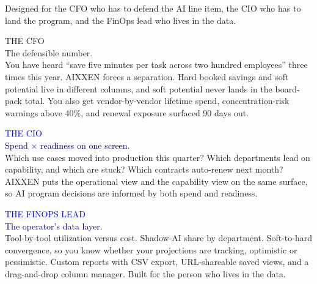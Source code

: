 \documentclass[10pt]{article}
\newcommand{\lead}[1]{{\medium\fontsize{11.5}{16}\selectfont\textcolor{slate}{#1}\par}}
\begin{document}
\lead{Designed for the CFO who has to defend the AI line item, the CIO who has to land the program, and the FinOps lead who lives in the data.}
\vspace{18pt}

\begin{navyblock}
{\semibold\fontsize{8}{8}\selectfont\textcolor{midblue}{THE CFO}}\\[5pt]
{\heavy\fontsize{13}{16}\selectfont The defensible number.}\\[6pt]
{\fontsize{8.9}{13.4}\selectfont\textcolor{linegray}{You have heard \enquote{save five minutes per task across two hundred employees} three times this year. AIXXEN forces a separation. Hard booked savings and soft potential live in different columns, and soft potential never lands in the board-pack total. You also get vendor-by-vendor lifetime spend, concentration-risk warnings above 40\%, and renewal exposure surfaced 90 days out.}}
\end{navyblock}

\vspace{14pt}
\begin{outblock}
{\semibold\fontsize{8}{8}\selectfont\textcolor{blue}{THE CIO}}\\[5pt]
{\heavy\fontsize{13}{16}\selectfont\textcolor{navy}{Spend $\times$ readiness on one screen.}}\\[6pt]
{\fontsize{8.9}{13.4}\selectfont\textcolor{slate}{Which use cases moved into production this quarter? Which departments lead on capability, and which are stuck? Which contracts auto-renew next month? AIXXEN puts the operational view and the capability view on the same surface, so AI program decisions are informed by both spend and readiness.}}
\end{outblock}
\newpage

\vspace*{2pt}
\begin{outblock}
{\semibold\fontsize{8}{8}\selectfont\textcolor{blue}{THE FINOPS LEAD}}\\[5pt]
{\heavy\fontsize{13}{16}\selectfont\textcolor{navy}{The operator's data layer.}}\\[6pt]
{\fontsize{8.9}{13.4}\selectfont\textcolor{slate}{Tool-by-tool utilization versus cost. Shadow-AI share by department. Soft-to-hard convergence, so you know whether your projections are tracking, optimistic or pessimistic. Custom reports with CSV export, URL-shareable saved views, and a drag-and-drop column manager. Built for the person who lives in the data.}}
\end{outblock}
\end{document}
